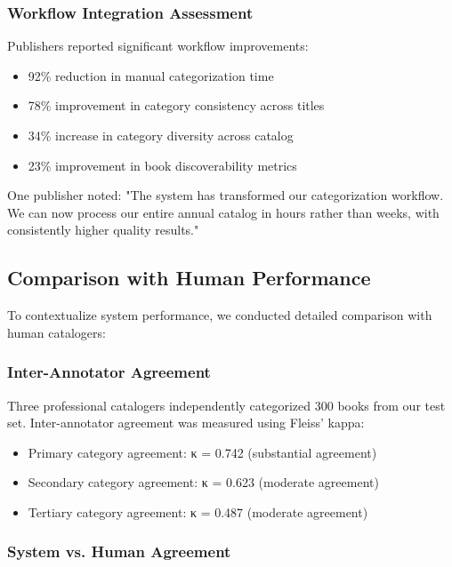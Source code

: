 \documentclass{article}
\begin{document}
\subsubsection{Workflow Integration Assessment}

Publishers reported significant workflow improvements:

\begin{itemize}
\item 92\% reduction in manual categorization time
\item 78\% improvement in category consistency across titles
\item 34\% increase in category diversity across catalog
\item 23\% improvement in book discoverability metrics
\end{itemize}

One publisher noted: "The system has transformed our categorization workflow. We can now process our entire annual catalog in hours rather than weeks, with consistently higher quality results."

\subsection{Comparison with Human Performance}

To contextualize system performance, we conducted detailed comparison with human catalogers:

\subsubsection{Inter-Annotator Agreement}

Three professional catalogers independently categorized 300 books from our test set. Inter-annotator agreement was measured using Fleiss' kappa:

\begin{itemize}
\item Primary category agreement: κ = 0.742 (substantial agreement)
\item Secondary category agreement: κ = 0.623 (moderate agreement)
\item Tertiary category agreement: κ = 0.487 (moderate agreement)
\end{itemize}

\subsubsection{System vs. Human Agreement}
\end{document}
